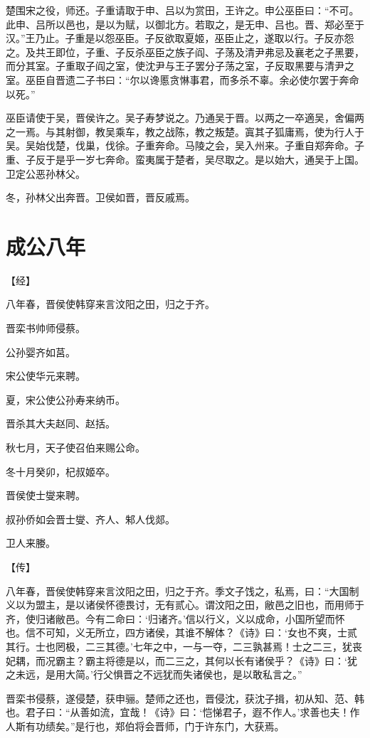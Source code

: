 \documentclass[a4paper,12pt,UTF8,twoside]{ctexbook}
\begin{document}
楚围宋之役，师还。子重请取于申、吕以为赏田，王许之。申公巫臣曰：“不可。此申、吕所以邑也，是以为赋，以御北方。若取之，是无申、吕也。晋、郑必至于汉。”王乃止。子重是以怨巫臣。子反欲取夏姬，巫臣止之，遂取以行。子反亦怨之。及共王即位，子重、子反杀巫臣之族子阎、子荡及清尹弗忌及襄老之子黑要，而分其室。子重取子阎之室，使沈尹与王子罢分子荡之室，子反取黑要与清尹之室。巫臣自晋遗二子书曰：“尔以谗慝贪惏事君，而多杀不辜。余必使尔罢于奔命以死。”

巫臣请使于吴，晋侯许之。吴子寿梦说之。乃通吴于晋。以两之一卒適吴，舍偏两之一焉。与其射御，教吴乘车，教之战陈，教之叛楚。寘其子狐庸焉，使为行人于吴。吴始伐楚，伐巢，伐徐。子重奔命。马陵之会，吴入州来。子重自郑奔命。子重、子反于是乎一岁七奔命。蛮夷属于楚者，吴尽取之。是以始大，通吴于上国。卫定公恶孙林父。

冬，孙林父出奔晋。卫侯如晋，晋反戚焉。


\chapter{成公八年}



【经】

八年春，晋侯使韩穿来言汶阳之田，归之于齐。

晋栾书帅师侵蔡。

公孙婴齐如莒。

宋公使华元来聘。

夏，宋公使公孙寿来纳币。

晋杀其大夫赵同、赵括。

秋七月，天子使召伯来赐公命。

冬十月癸卯，杞叔姬卒。

晋侯使士燮来聘。

叔孙侨如会晋士燮、齐人、邾人伐郯。

卫人来媵。

【传】

八年春，晋侯使韩穿来言汶阳之田，归之于齐。季文子饯之，私焉，曰：“大国制义以为盟主，是以诸侯怀德畏讨，无有贰心。谓汶阳之田，敝邑之旧也，而用师于齐，使归诸敝邑。今有二命曰：‘归诸齐。’信以行义，义以成命，小国所望而怀也。信不可知，义无所立，四方诸侯，其谁不解体？《诗》曰：‘女也不爽，士贰其行。士也罔极，二三其德。’七年之中，一与一夺，二三孰甚焉！士之二三，犹丧妃耦，而况霸主？霸主将德是以，而二三之，其何以长有诸侯乎？《诗》曰：‘犹之未远，是用大简。’行父惧晋之不远犹而失诸侯也，是以敢私言之。”

晋栾书侵蔡，遂侵楚，获申骊。楚师之还也，晋侵沈，获沈子揖，初从知、范、韩也。君子曰：“从善如流，宜哉！《诗》曰：‘恺悌君子，遐不作人。’求善也夫！作人斯有功绩矣。”是行也，郑伯将会晋师，门于许东门，大获焉。
\end{document}
